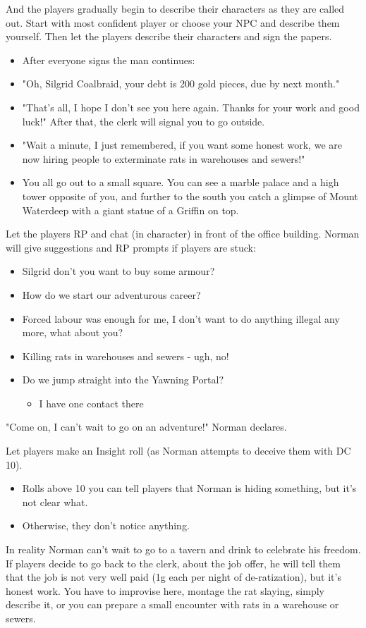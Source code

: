 \documentclass[10pt,onecolumn,twoside,openany,bg=full,layout=true]{dndbook}
\begin{document}
And the players gradually begin to describe their characters as they are called out.
Start with most confident player or choose your NPC and describe them yourself.
Then let the players describe their characters and sign the papers.
\begin{DndReadAloud}
\begin{itemize}
  \item After everyone signs the man continues:
  \item "Oh, Silgrid Coalbraid, your debt is 200 gold pieces, due by next month."
  \item "That's all, I hope I don't see you here again.
  Thanks for your work and good luck!"
  After that, the clerk will signal you to go outside.
  \item "Wait a minute, I just remembered, if you want some honest work, we are now hiring people to exterminate rats in warehouses and sewers!"
  \item You all go out to a small square.
You can see a marble palace and a high tower opposite of you, and further to the south you catch a glimpse of Mount Waterdeep with a giant statue of a Griffin on top.
\end{itemize}

\end{DndReadAloud}
Let the players RP and chat (in character) in front of the office building.
Norman will give suggestions and RP prompts if players are stuck:
\begin{itemize}
  \item Silgrid don't you want to buy some armour?
  \item How do we start our adventurous career?
  \item Forced labour was enough for me, I don’t want to do anything illegal any more, what about you?
  \item Killing rats in warehouses and sewers - ugh, no!
  \item Do we jump straight into the Yawning Portal?
  \begin{itemize}
    \item I have one contact there
  \end{itemize}
\end{itemize}
\begin{DndReadAloud}
"Come on, I can't wait to go on an adventure!" Norman declares.
\end{DndReadAloud}
Let players make an Insight roll (as Norman attempts to deceive them with DC 10).
\begin{itemize}
\item Rolls above 10 you can tell players that Norman is hiding something, but it's not clear what.
\item Otherwise, they don't notice anything.
\end{itemize}
In reality Norman can't wait to go to a tavern and drink to celebrate his freedom.
If players decide to go back to the clerk, about the job offer, he will tell them that the job is not very well paid (1g each per night of de-ratization), but it's honest work.
You have to improvise here, montage the rat slaying, simply describe it, or you can prepare a small encounter with rats in a warehouse or sewers.
\end{document}
